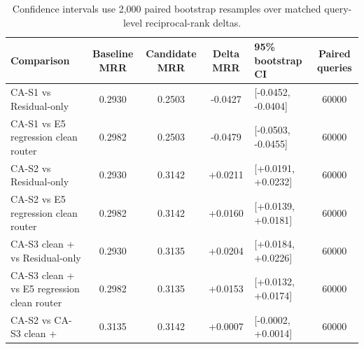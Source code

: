 \begin{table}[t]
\centering
\small
\caption{Paired bootstrap significance for candidate-aware full-ranking routers.}
\label{tab:candidate_router_significance}
\begin{tabular}{p{}cccp{}c}
\toprule
Comparison & Baseline MRR & Candidate MRR & Delta MRR & 95\% bootstrap CI & Paired queries \\
\midrule
CA-S1 vs Residual-only & 0.2930 & 0.2503 & -0.0427 & [-0.0452, -0.0404] & 60000 \\
CA-S1 vs E5 regression clean router & 0.2982 & 0.2503 & -0.0479 & [-0.0503, -0.0455] & 60000 \\
CA-S2 vs Residual-only & 0.2930 & 0.3142 & +0.0211 & [+0.0191, +0.0232] & 60000 \\
CA-S2 vs E5 regression clean router & 0.2982 & 0.3142 & +0.0160 & [+0.0139, +0.0181] & 60000 \\
CA-S3 clean + vs Residual-only & 0.2930 & 0.3135 & +0.0204 & [+0.0184, +0.0226] & 60000 \\
CA-S3 clean + vs E5 regression clean router & 0.2982 & 0.3135 & +0.0153 & [+0.0132, +0.0174] & 60000 \\
CA-S2 vs CA-S3 clean + & 0.3135 & 0.3142 & +0.0007 & [-0.0002, +0.0014] & 60000 \\
\bottomrule
\end{tabular}
\vspace{0.4ex}\caption*{\footnotesize Confidence intervals use 2,000 paired bootstrap resamples over matched query-level reciprocal-rank deltas.}
\end{table}
